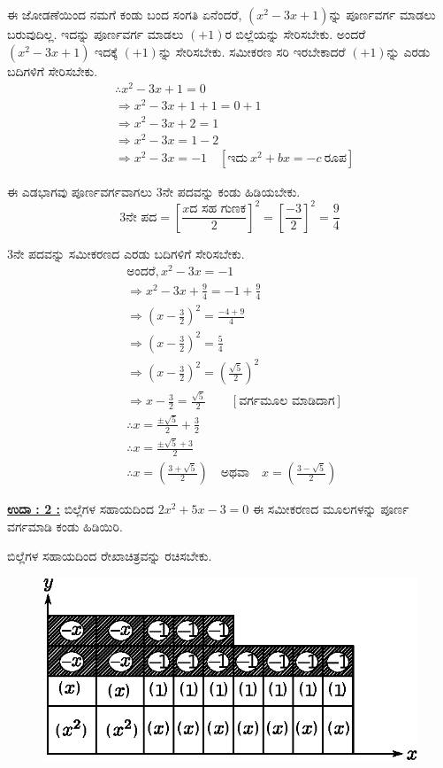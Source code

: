 ಈ ಜೋಡಣೆಯಿಂದ ನಮಗೆ ಕಂಡು ಬಂದ ಸಂಗತಿ ಏನೆಂದರೆ, $(x^2 - 3x + 1)$ನ್ನು ಪೂರ್ಣವರ್ಗ ಮಾಡಲು ಬರುವುದಿಲ್ಲ. ಇದನ್ನು ಪೂರ್ಣವರ್ಗ ಮಾಡಲು $(+1)$ರ ಬಿಲ್ಲೆಯನ್ನು ಸೇರಿಸಬೇಕು. ಅಂದರೆ $(x^2 - 3x + 1)$ ಇದಕ್ಕೆ $(+1)$ನ್ನು ಸೇರಿಸಬೇಕು. ಸಮೀಕರಣ ಸರಿ ಇರಬೇಕಾದರೆ $(+1)$ನ್ನು ಎರಡು ಬದಿಗಳಿಗೆ ಸೇರಿಸಬೇಕು. 
\begin{align*}
& \therefore x^2 - 3x + 1 = 0\\
& \Rightarrow x^2 - 3x + 1 + 1 = 0 + 1\\
& \Rightarrow x^2 - 3x + 2 = 1\\
& \Rightarrow x^2 - 3x = 1 - 2\\
& \Rightarrow x^2 - 3x = -1 \quad [\text{ಇದು}~ x^2 + bx = -c ~\text{ರೂಪ}]
\end{align*}

ಈ ಎಡಭಾಗವು ಪೂರ್ಣವರ್ಗವಾಗಲು 3ನೇ ಪದವನ್ನು ಕಂಡು ಹಿಡಿಯಬೇಕು. 
$$
3\text{ನೇ ಪದ} = \left[\dfrac{x \text{ದ ಸಹ ಗುಣಕ}}{2} \right]^2 = \left[\dfrac{-3}{2}\right]^2 = \dfrac{9}{4}
$$

3ನೇ ಪದವನ್ನು ಸಮೀಕರಣದ ಎರಡು ಬದಿಗಳಿಗೆ ಸೇರಿಸಬೇಕು. 
\begin{align*}
& \text{ಅಂದರೆ}, x^2 - 3x = -1\\
& \Rightarrow x^2 - 3x + \frac{9}{4} = -1 + \frac{9}{4}\\
& \Rightarrow \left(x - \frac{3}{2} \right)^2 = \frac{-4 + 9}{4}\\
& \Rightarrow \left(x - \frac{3}{2} \right)^2 = \frac{5}{4}\\
& \Rightarrow \left(x - \frac{3}{2} \right)^2 = \left(\frac{\surd 5}{2}\right)^2\\
& \Rightarrow x - \frac{3}{2} = \frac{\surd 5}{2} \qquad [\text{ವರ್ಗಮೂಲ ಮಾಡಿದಾಗ}]\\
& \therefore x = \frac{\pm \surd 5}{2} + \frac{3}{2}\\
& \therefore x = \frac{\pm \surd 5 + 3}{2}\\
& \therefore x = \left(\frac{3 + \surd5}{2}\right) \quad\text{ಅಥವಾ}\quad x = \left(\frac{3 - \surd 5}{2}\right)
\end{align*}

\noindent
{\textbf{\underline{ಉದಾ : 2 :}}} ಬಿಲ್ಲೆಗಳ ಸಹಾಯದಿಂದ $2x^2 + 5x - 3 = 0$ ಈ ಸಮೀಕರಣದ ಮೂಲಗಳನ್ನು ಪೂರ್ಣ ವರ್ಗಮಾಡಿ ಕಂಡು ಹಿಡಿಯಿರಿ. 

ಬಿಲ್ಲೆಗಳ ಸಹಾಯದಿಂದ ರೇಖಾಚಿತ್ರವನ್ನು ರಚಿಸಬೇಕು.
\begin{figure}[H]
\centering
\includegraphics[scale=0.8]{src/figure/chap3/fig3-48.eps}
\end{figure}


